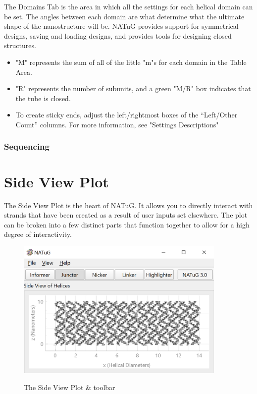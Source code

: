 \documentclass[titlepage]{article}
\begin{document}
	The Domains Tab is the area in which all the settings for each helical domain can be set. The angles between each domain are what determine what the ultimate shape of the nanostructure will be. NATuG provides support for symmetrical designs, saving and loading designs, and provides tools for designing closed structures.
	
	\begin{itemize}
		\item "M" represents the sum of all of the little "m"s for each domain in the Table Area.
		\item "R" represents the number of subunits, and a green "M/R" box indicates that the tube is closed.
		\item To create sticky ends, adjust the left/rightmost boxes of the “Left/Other Count” columns. For more information, see "Settings Descriptions"
	\end{itemize}
	
	\subsubsection{Sequencing}
	
	\section{Side View Plot}
	The Side View Plot is the heart of NATuG. It allows you to directly interact with strands that have been created as a result of user inputs set elsewhere. The plot can be broken into a few distinct parts that function together to allow for a high degree of interactivity. 
	
	\begin{figure}[h]
		\centering
		\caption{The Side View Plot \& toolbar}
		\includegraphics[width=4in]{short-side-view-overview.png}
		\label{fig:short-side-view-overview}
	\end{figure}
\end{document}
